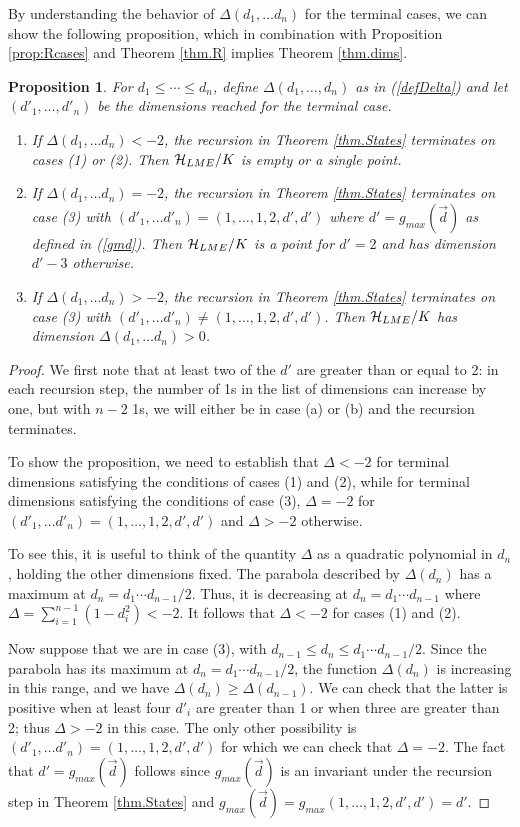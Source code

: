 \documentclass[12pt]{article}
\newtheorem{proposition}[theorem]{Proposition}
\theoremstyle{definition}
\begin{document}
By understanding the behavior of $\Delta(d_1, \dots d_n)$ for the terminal cases, we can show the following proposition, which in combination with Proposition \ref{prop:Rcases} and Theorem \ref{thm.R} implies Theorem \ref{thm.dims}.
\begin{proposition} \label{prop.terminal}
For $d_1 \le \cdots \le d_n$, define $\Delta(d_1, \dots, d_n)$ as in (\ref{defDelta}) and let $(d'_1, \dots, d'_n)$ be the dimensions reached for the terminal case.
\begin{enumerate}
\item
If $\Delta(d_1, \dots d_n) < -2$, the recursion in Theorem \ref{thm.States} terminates on cases (1) or (2). Then ${\cal H}_{LME}/K$ is empty or a single point.
\item
If $\Delta(d_1, \dots d_n) = -2$, the recursion in Theorem \ref{thm.States} terminates on case (3) with $(d'_1, \dots d'_n) = (1,\dots,1,2,d',d')$ where $d' = g_{max}(\vec{d})$ as defined in (\ref{gmd}). Then ${\cal H}_{LME}/K$ is a point for $d'=2$ and has dimension $d'-3$ otherwise.
\item
If $\Delta(d_1, \dots d_n) > -2$, the recursion in Theorem \ref{thm.States} terminates on case (3) with $(d'_1, \dots d'_n) \ne (1,\dots,1,2,d',d')$. Then ${\cal H}_{LME}/K$ has dimension $\Delta(d_1, \dots d_n) > 0$.
\end{enumerate}
\end{proposition}
\begin{proof}
We first note that at least two of the $d'$ are greater than or equal to 2: in each recursion step, the number of 1s in the list of dimensions can increase by one, but with $n-2$ 1s, we will either be in case (a) or (b) and the recursion terminates.

To show the proposition, we need to establish that $\Delta < -2$ for terminal dimensions satisfying the conditions of cases (1) and (2), while for terminal dimensions satisfying the conditions of case (3), $\Delta = -2$ for $(d'_1, \dots d'_n) = (1,\dots,1,2,d',d')$ and $\Delta > -2$ otherwise.

To see this, it is useful to think of the quantity $\Delta$ as a quadratic polynomial in $d_n$, holding the other dimensions fixed. The parabola described by $\Delta(d_n)$ has a maximum at $d_n = d_1 \cdots d_{n-1}/2$. Thus, it is decreasing at $d_n = d_1 \cdots d_{n-1}$ where $\Delta = \sum_{i=1}^{n-1} (1 - d_i^2) < -2$. It follows that $\Delta < -2$ for cases (1) and (2).

Now suppose that we are in case (3), with $d_{n-1} \le d_n \le d_1 \cdots d_{n-1}/2$. Since the parabola has its maximum at $d_n = d_1 \cdots d_{n-1}/2$, the function $\Delta(d_n)$ is increasing in this range, and we have $\Delta(d_n) \ge \Delta(d_{n-1})$. We can check that the latter is positive when at least four $d'_i$ are greater than 1 or when three are greater than 2; thus $\Delta > -2$ in this case. The only other possibility is $(d'_1, \dots d'_n) = (1,\dots,1,2,d',d')$ for which we can check that $\Delta = -2$. The fact that $d' = g_{max}(\vec{d})$ follows since $g_{max}(\vec{d})$ is an invariant under the recursion step in Theorem \ref{thm.States} and $g_{max}(\vec{d}) = g_{max}(1,\dots,1,2,d',d') = d'$.
\end{proof}
\end{document}
